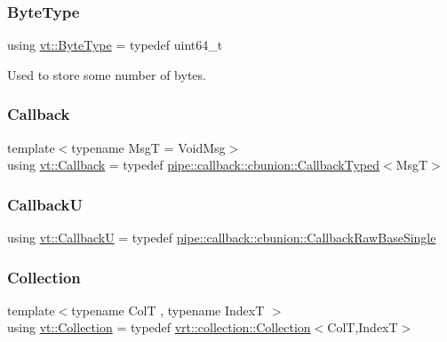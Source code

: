 \mbox{\label{namespacevt_aab8d55968084610ce3b17057981e9300}} 
\subsubsection{\texorpdfstring{Byte\+Type}{ByteType}}
{\footnotesize\ttfamily using \hyperlink{namespacevt_aab8d55968084610ce3b17057981e9300}{vt\+::\+Byte\+Type} = typedef uint64\+\_\+t}



Used to store some number of bytes. 

\mbox{\label{namespacevt_a36db99df4c973d48b1118a293fff533f}} 
\subsubsection{\texorpdfstring{Callback}{Callback}}
{\footnotesize\ttfamily template$<$typename MsgT  = Void\+Msg$>$ \\
using \hyperlink{namespacevt_a36db99df4c973d48b1118a293fff533f}{vt\+::\+Callback} = typedef \hyperlink{structvt_1_1pipe_1_1callback_1_1cbunion_1_1_callback_typed}{pipe\+::callback\+::cbunion\+::\+Callback\+Typed}$<$MsgT$>$}

\mbox{\label{namespacevt_af79a43a97bc3593fc349f086c874c48e}} 
\subsubsection{\texorpdfstring{CallbackU}{CallbackU}}
{\footnotesize\ttfamily using \hyperlink{namespacevt_af79a43a97bc3593fc349f086c874c48e}{vt\+::\+CallbackU} = typedef \hyperlink{structvt_1_1pipe_1_1callback_1_1cbunion_1_1_callback_raw_base_single}{pipe\+::callback\+::cbunion\+::\+Callback\+Raw\+Base\+Single}}

\mbox{\label{namespacevt_ac72e048964e4bb536faaa8bc90f58db7}} 
\subsubsection{\texorpdfstring{Collection}{Collection}}
{\footnotesize\ttfamily template$<$typename ColT , typename IndexT $>$ \\
using \hyperlink{namespacevt_ac72e048964e4bb536faaa8bc90f58db7}{vt\+::\+Collection} = typedef \hyperlink{structvt_1_1vrt_1_1collection_1_1_collection}{vrt\+::collection\+::\+Collection}$<$ColT,IndexT$>$}

